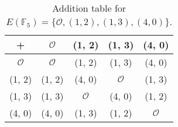 \documentclass[
  coursecode={MTHE 418},
  assignmentname={Homework \homeworknumber},
  studentnumber=20053722,
  name={Bryan Hoang},
  draft,
]{
  ltxanswer%
}
\begin{document}
  \begin{questions}
    \setcounter{question}{\questionnumber}
    \addtocounter{question}{-1}
    \question[10]\
    \begin{parts}
      \part{}
      \begin{solution}
        \begin{table}
          \caption{Addition table for \(E(\mathbb{F}_{5}) = \{\mathcal{O}, (1, 2), (1, 3), (4, 0)\}\).}
          \renewcommand\arraystretch{1.3}
          \setlength\doublerulesep{0pt}
          \begin{tabular}{|c||*{4}{c|}}
            \hline
            +               & \(\mathcal{O}\) & (1, 2)          & (1, 3)          & (4, 0)          \\
            \hline
            \(\mathcal{O}\) & \(\mathcal{O}\) & (1, 2)          & (1, 3)          & (4, 0)          \\
            \hline
            (1, 2)          & (1, 2)          & (4, 0)          & \(\mathcal{O}\) & (1, 3)          \\
            \hline
            (1, 3)          & (1, 3)          & \(\mathcal{O}\) & (4, 0)          & (1, 2)          \\
            \hline
            (4, 0)          & (4, 0)          & (1, 3)          & (1, 2)          & \(\mathcal{O}\) \\
            \hline
          \end{tabular}
        \end{table}
      \end{solution}


\end{parts}
\end{questions}
\end{document}
